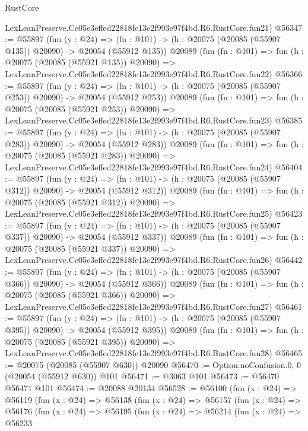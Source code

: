 \begin{lexlean}{RustCore}
\begin{coremodule}
    LexLeanPreserve.Cc05e3effed22818fe13e2f993e97f4bd.R6.RustCore.fun21)
@56347 := @55897
    (fun (y : @24) =>
    (fn : @101) -> (h : @20075 (@20085 (@55907 @135)) @20090) -> @20054 (@55912 @135))
    @20089
    (fun (fn : @101) =>
    fun (h : @20075 (@20085 (@55921 @135)) @20090) =>
    LexLeanPreserve.Cc05e3effed22818fe13e2f993e97f4bd.R6.RustCore.fun22)
@56366 := @55897
    (fun (y : @24) =>
    (fn : @101) -> (h : @20075 (@20085 (@55907 @253)) @20090) -> @20054 (@55912 @253))
    @20089
    (fun (fn : @101) =>
    fun (h : @20075 (@20085 (@55921 @253)) @20090) =>
    LexLeanPreserve.Cc05e3effed22818fe13e2f993e97f4bd.R6.RustCore.fun23)
@56385 := @55897
    (fun (y : @24) =>
    (fn : @101) -> (h : @20075 (@20085 (@55907 @283)) @20090) -> @20054 (@55912 @283))
    @20089
    (fun (fn : @101) =>
    fun (h : @20075 (@20085 (@55921 @283)) @20090) =>
    LexLeanPreserve.Cc05e3effed22818fe13e2f993e97f4bd.R6.RustCore.fun24)
@56404 := @55897
    (fun (y : @24) =>
    (fn : @101) -> (h : @20075 (@20085 (@55907 @312)) @20090) -> @20054 (@55912 @312))
    @20089
    (fun (fn : @101) =>
    fun (h : @20075 (@20085 (@55921 @312)) @20090) =>
    LexLeanPreserve.Cc05e3effed22818fe13e2f993e97f4bd.R6.RustCore.fun25)
@56423 := @55897
    (fun (y : @24) =>
    (fn : @101) -> (h : @20075 (@20085 (@55907 @337)) @20090) -> @20054 (@55912 @337))
    @20089
    (fun (fn : @101) =>
    fun (h : @20075 (@20085 (@55921 @337)) @20090) =>
    LexLeanPreserve.Cc05e3effed22818fe13e2f993e97f4bd.R6.RustCore.fun26)
@56442 := @55897
    (fun (y : @24) =>
    (fn : @101) -> (h : @20075 (@20085 (@55907 @366)) @20090) -> @20054 (@55912 @366))
    @20089
    (fun (fn : @101) =>
    fun (h : @20075 (@20085 (@55921 @366)) @20090) =>
    LexLeanPreserve.Cc05e3effed22818fe13e2f993e97f4bd.R6.RustCore.fun27)
@56461 := @55897
    (fun (y : @24) =>
    (fn : @101) -> (h : @20075 (@20085 (@55907 @395)) @20090) -> @20054 (@55912 @395))
    @20089
    (fun (fn : @101) =>
    fun (h : @20075 (@20085 (@55921 @395)) @20090) =>
    LexLeanPreserve.Cc05e3effed22818fe13e2f993e97f4bd.R6.RustCore.fun28)
@56465 := @20075 (@20085 (@55907 @630)) @20090
@56470 := Option.noConfusion.{0, 0} (@20054 (@55912 @630)) @101
@56471 := @3063 @101
@56473 := @56470 @56471 @101
@56474 := @20088 @20134
@56528 := @56100
    (fun (x : @24) =>
    @56119
      (fun (x : @24) =>
      @56138
        (fun (x : @24) =>
        @56157
          (fun (x : @24) =>
          @56176
            (fun (x : @24) =>
            @56195
              (fun (x : @24) =>
              @56214
                (fun (x : @24) =>
                @56233

\end{coremodule}
\end{lexlean}
